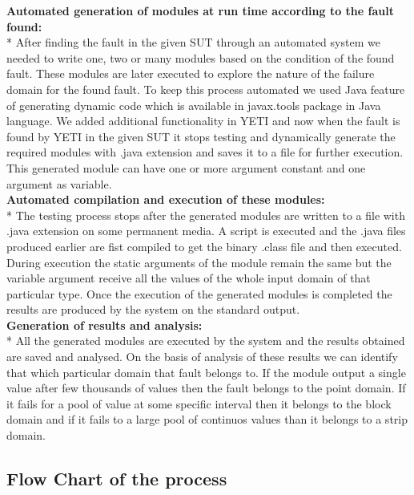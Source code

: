 \documentclass{acm_proc_article-sp}
\begin{document}
\noindent \textbf{Automated generation of modules at run time according to the fault found:}\\*
\indent After finding the fault in the given SUT through an automated system we needed to write one, two or many modules based on the condition of the found fault. These modules are later executed to explore the nature of the failure domain for the found fault. To keep this process automated we used Java feature of generating dynamic code which is available in javax.tools package in Java language. We added additional functionality in YETI and now when the fault is found by YETI in the given SUT it stops testing and dynamically generate the required modules with .java extension and saves it to a file for further execution. This generated module can have one or more argument constant and one argument as variable.\\

\noindent \textbf{Automated compilation and execution of these modules:}\\*
\indent The testing process stops after the generated modules are written to a file with .java extension on some permanent media. A script is executed and the .java files produced earlier are fist compiled to get the binary .class file and then executed. During execution the static arguments of the module remain the same but the variable argument receive all the values of the whole input domain of that particular type. Once the execution of the generated modules is completed the results are produced by the system on the standard output.\\

\noindent \textbf{Generation of results and analysis:}\\*
\indent All the generated modules are executed by the system and the results obtained are saved and analysed. On the basis of analysis of these results we can identify that which particular domain that fault belongs to. If the module output a single value after few thousands of values then the fault belongs to the point domain. If it fails for a pool of value at some specific interval then it belongs to the block domain and if it fails to a large pool of continuos values than it belongs to a strip domain.\\

\subsection{Flow Chart of the process}
\end{document}
